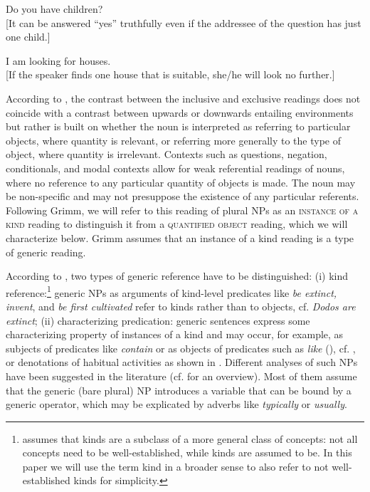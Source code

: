 \documentclass[output=paper,colorlinks,citecolor=brown,
]{langscibook}
\begin{document}
\ea\label{ex:8}
Do you have children? \\
{[}It can be answered ``yes'' truthfully even if the addressee of the question has just one child.{]}
\z
	
\ea\label{ex:9}	
I am looking for houses. \hfill \citep[249]{Grimm2013} \\
{[}If the speaker finds one house that is suitable, she/he will look no further.{]}
\z

\noindent According to \citet{Grimm2013}, the contrast between the inclusive and exclusive readings does not coincide with a contrast between upwards or downwards entailing environments but rather is built on whether the noun is interpreted as referring to particular objects, where quantity is relevant, or referring more generally to the type of object, where quantity is irrelevant. Contexts such as questions, negation, conditionals, and modal contexts allow for weak referential readings of nouns, where no reference to any particular quantity of objects is made. The noun may be non-specific and may not presuppose the existence of any particular referents. Following Grimm, we will refer to this reading of plural NPs as an \textsc{instance of a kind} reading to distinguish it from a \textsc{quantified object} reading, which we will characterize below. Grimm assumes that an instance of a kind reading is a type of generic reading. 

According to \citet{KrifkaTerMeulen1995}, two types of generic reference have to be distinguished: (i) kind reference:\footnote{\citet{Krifka1995} assumes that kinds are a subclass of a more general class of concepts: not all concepts need to be well-established, while kinds are assumed to be. In this paper we will use the term kind in a broader sense to also refer to not well-established kinds for simplicity.} generic NPs as arguments of kind-level predicates like \textit{be extinct, invent}, and \textit{be first cultivated} refer to kinds rather than to objects, cf. \textit{Dodos are extinct}; (ii) characterizing predication: generic sentences express some characterizing property of instances of a kind and may occur, for example, as subjects of predicates like \textit{contain} or as objects of predicates such as \textit{like} (\citealt[71f]{KrifkaTerMeulen1995}), cf. , or denotations of habitual activities as shown in . Different analyses of such NPs have been suggested in the literature (cf. \citealt{Krifka2004} for an overview). Most of them assume that the generic (bare plural) NP introduces a variable that can be bound by a generic operator, which may be explicated by adverbs like \textit{typically} or \textit{usually}.   
\end{document}
